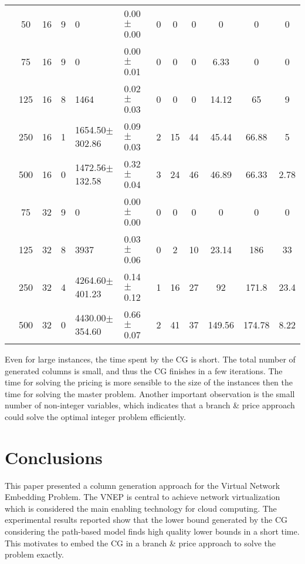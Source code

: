 \documentclass[12pt]{article}
\begin{document}
\begin{table}[h]
\begin{center}
\begin{tabular}{c c c c l l c c c c c c}
 &50      &  16  &    9  &  0                   &        0.00$\pm$0.00  &  0  &          0   &            0   &         0       &       0       &  0       \\
 &75      &  16  &    9  &  0                   &        0.00$\pm$0.01  &  0  &          0   &            0   &         6.33    &       0       &  0       \\
 &125     &  16  &    8  &  1464                &        0.02$\pm$0.03  &  0  &          0   &            0   &         14.12   &       65      &  9       \\
 &250     &  16  &    1  &  1654.50$\pm$302.86  &        0.09$\pm$0.03  &  2  &          15  &            44  &         45.44   &       66.88   &  5       \\
 &500     &  16  &    0  &  1472.56$\pm$132.58  &        0.32$\pm$0.04  &  3  &          24  &            46  &         46.89   &       66.33   &  2.78    \\
 &75      &  32  &    9  &  0                   &        0.00$\pm$0.00  &  0  &          0   &            0   &         0       &       0       &  0       \\
 &125     &  32  &    8  &  3937                &        0.03$\pm$0.06  &  0  &          2   &            10  &         23.14   &       186     &  33      \\
 &250     &  32  &    4  &  4264.60$\pm$401.23  &        0.14$\pm$0.12  &  1  &          16  &            27  &         92      &       171.8   &  23.4    \\
 &500     &  32  &    0  &  4430.00$\pm$354.60  &        0.66$\pm$0.07  &  2  &          41  &            37  &         149.56  &       174.78  &  8.22    \\

\end{tabular}
\end{center}
\end{table}

Even for large instances, the time spent by the CG is short. 
The total number of generated columns is small, and thus the CG finishes in a few iterations.
The time for solving the pricing is more sensible to the size of the instances then the time for solving the master problem.
Another important observation is the small number of non-integer variables, which indicates that a branch \& price approach
could solve the optimal integer problem efficiently.

\section{Conclusions}
\label{sec:conclusion}
This paper presented a column generation approach for the 
Virtual Network Embedding Problem. 
The VNEP is central to achieve network virtualization which is considered the main enabling technology for cloud computing.
The experimental results reported show that the lower bound generated by the CG considering the path-based model
finds high quality lower bounds in a short time. This motivates to embed the CG in a branch \& price approach to solve the problem exactly.
\end{document}
